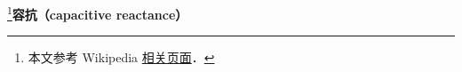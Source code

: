 
\begin{issues}
\issueDraft
\end{issues}

\footnote{本文参考 Wikipedia \href{https://en.wikipedia.org/wiki/Electrical_reactance}{相关页面}．}\textbf{容抗（capacitive reactance）}

